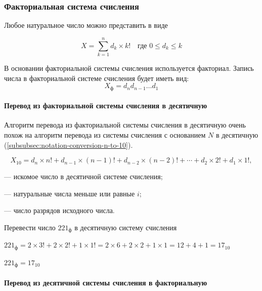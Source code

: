 \subsubsection{Факториальная система счисления}\label{subsubsec:factorial-notation-system}

Любое натуральное число можно представить в виде

\[
    X = \sum^{n}_{k = 1} d_{k}\times k! \quad \text{где  } 0 \leqslant d_{k} \leqslant k
\]

В основании факториальной системы счисления используется факториал.
Запись числа в факториальной системе счисления будет иметь вид:
\[
    X_{\text{ф}} = d_{n} d_{n-1} \dots d_{1}
\]

\paragraph{Перевод из факториальной системы счисления в десятичную}\label{par:factorial-to-decimal}

Алгоритм перевода из факториальной системы счисления в десятичную очень похож на алгоритм перевода из системы счисления с основанием $N$ в десятичную (\cref{subsubsec:notation-conversion-n-to-10}).

\[
    X_{10} = d_{n} \times n! + d_{n-1} \times (n-1)! + d_{n-2} \times (n-2)! + \cdots + d_{2}\times 2! + d_{1}\times 1!,
\]

\begin{where}
    \item [$X_{10}$] --- искомое число в десятичной системе счисления;
    \item [$d_{i}$] --- натуральные числа меньше или равные $i$;
    \item [$n$] --- число разрядов исходного числа.
\end{where}

\begin{example}
    \task%
    Перевести число $221_{\text{ф}}$ в десятичную систему счисления

    \solution%
    \(221_{\text{ф}} = 2 \times 3! + 2 \times 2! + 1\times 1! \allowbreak = 2 \times 6 + 2 \times 2 + 1 \times 1 \allowbreak = 12 + 4 + 1 \allowbreak = 17_{10}
    \)

    \answer%
    $221_{\text{ф}} = 17_{10}$
\end{example}

\paragraph{Перевод из десятичной системы счисления в факториальную}\label{par:decimal-to-factorial}

